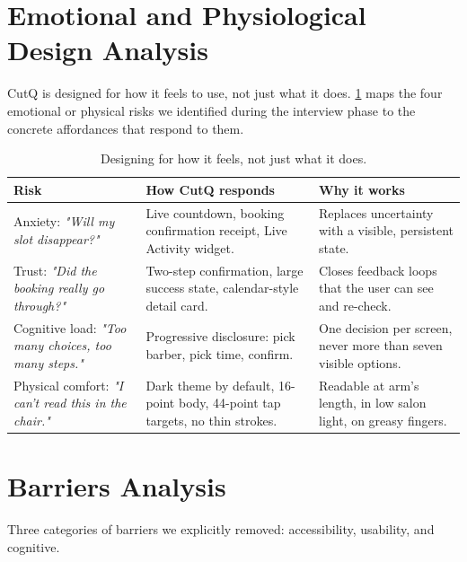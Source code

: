 \documentclass[12pt,a4paper]{article}
\begin{document}
\section{Emotional and Physiological Design Analysis}
\label{sec:emotional}

CutQ is designed for how it feels to use, not just what it does.
\cref{tab:emo} maps the four emotional or physical risks we
identified during the interview phase to the concrete affordances
that respond to them.

\begin{table}[H]
\centering\small
\begin{tabular}{@{}p{5.0cm}p{5.0cm}p{5.0cm}@{}}
\toprule
\textbf{Risk} & \textbf{How CutQ responds} & \textbf{Why it works}\\
\midrule
Anxiety: \emph{"Will my slot disappear?"} &
  Live countdown, booking confirmation receipt, Live Activity widget. &
  Replaces uncertainty with a visible, persistent state.\\
\addlinespace
Trust: \emph{"Did the booking really go through?"} &
  Two-step confirmation, large success state, calendar-style detail
  card. &
  Closes feedback loops that the user can see and re-check.\\
\addlinespace
Cognitive load: \emph{"Too many choices, too many steps."} &
  Progressive disclosure: pick barber, pick time, confirm. &
  One decision per screen, never more than seven visible options.\\
\addlinespace
Physical comfort: \emph{"I can't read this in the chair."} &
  Dark theme by default, 16-point body, 44-point tap targets, no
  thin strokes. &
  Readable at arm's length, in low salon light, on greasy fingers.\\
\bottomrule
\end{tabular}
\caption{Designing for how it feels, not just what it does.}
\label{tab:emo}
\end{table}
\vspace{-30pt}
\section{Barriers Analysis}
\label{sec:barriers}

Three categories of barriers we explicitly removed: accessibility,
usability, and cognitive.
\end{document}
